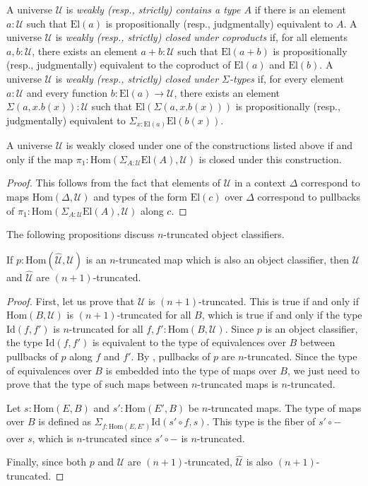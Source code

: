\documentclass[reqno]{amsart}
\theoremstyle{definition}
\theoremstyle{remark}
\newcommand{\fs}[1]{\mathrm{#1}}
\newcommand{\Hom}{\fs{Hom}}
\newcommand{\Id}{\fs{Id}}
\newcommand{\El}{\fs{El}}
\numberwithin{figure}{section}
\begin{document}
A universe $\mathcal{U}$ is \emph{weakly (resp., strictly) contains a type $A$} if there is an element $a : \mathcal{U}$ such that $\El(a)$ is propositionally (resp., judgmentally) equivalent to $A$. 
A universe $\mathcal{U}$ is \emph{weakly (resp., strictly) closed under coproducts} if, for all elements $a,b : \mathcal{U}$, there exists an element $a + b : \mathcal{U}$ such that $\El(a + b)$ is propositionally (resp., judgmentally) equivalent to the coproduct of $\El(a)$ and $\El(b)$.
A universe $\mathcal{U}$ is \emph{weakly (resp., strictly) closed under $\Sigma$-types} if, for every element $a : \mathcal{U}$ and every function $b : \El(a) \to \mathcal{U}$, there exists an element $\Sigma(a,x.b(x)) : \mathcal{U}$ such that $\El(\Sigma(a,x.b(x)))$ is propositionally (resp., judgmentally) equivalent to $\Sigma_{x : \El(a)} \El(b(x))$.

\begin{prop}
A universe $\mathcal{U}$ is weakly closed under one of the constructions listed above if and only if the map $\pi_1 : \Hom(\Sigma_{A : \mathcal{U}} \El(A), \mathcal{U})$ is closed under this construction.
\end{prop}
\begin{proof}
This follows from the fact that elements of $\mathcal{U}$ in a context $\Delta$ correspond to maps $\Hom(\Delta, \mathcal{U})$ and
types of the form $\El(c)$ over $\Delta$ correspond to pullbacks of $\pi_1 : \Hom(\Sigma_{A : \mathcal{U}} \El(A), \mathcal{U})$ along $c$.
\end{proof}

The following propositions discuss $n$-truncated object classifiers.

\begin{prop}
If $p : \Hom(\widehat{\mathcal{U}},\mathcal{U})$ is an $n$-truncated map which is also an object classifier, then $\mathcal{U}$ and $\widehat{\mathcal{U}}$ are $(n+1)$-truncated.
\end{prop}
\begin{proof}
First, let us prove that $\mathcal{U}$ is $(n+1)$-truncated.
This is true if and only if $\Hom(B,\mathcal{U})$ is $(n+1)$-truncated for all $B$, which is true if and only if the type $\Id(f,f')$ is $n$-truncated for all $f,f' : \Hom(B,\mathcal{U})$.
Since $p$ is an object classifier, the type $\Id(f,f')$ is equivalent to the type of equivalences over $B$ between pullbacks of $p$ along $f$ and $f'$.
By , pullbacks of $p$ are $n$-truncated.
Since the type of equivalences over $B$ is embedded into the type of maps over $B$, we just need to prove that the type of such maps between $n$-truncated maps is $n$-truncated.

Let $s : \Hom(E,B)$ and $s' : \Hom(E',B)$ be $n$-truncated maps.
The type of maps over $B$ is defined as $\Sigma_{f : \Hom(E,E')} \Id(s' \circ f, s)$.
This type is the fiber of $s' \circ -$ over $s$, which is $n$-truncated since $s' \circ -$ is $n$-truncated.

Finally, since both $p$ and $\mathcal{U}$ are $(n+1)$-truncated, $\widehat{\mathcal{U}}$ is also $(n+1)$-truncated.
\end{proof}
\end{document}
